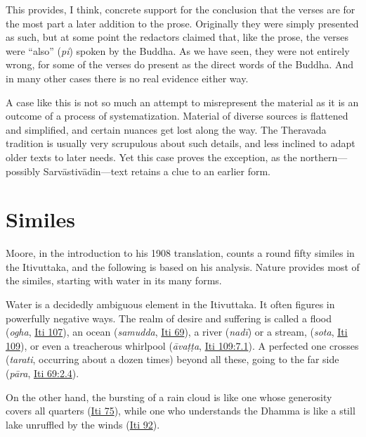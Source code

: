 \documentclass[12pt,openany]{book}%
\begin{document}
This provides, I think, concrete support for the conclusion that the verses are for the most part a later addition to the prose. Originally they were simply presented as such, but at some point the redactors claimed that, like the prose, the verses were “also” (\emph{pi}) spoken by the Buddha. As we have seen, they were not entirely wrong, for some of the verses do present as the direct words of the Buddha. And in many other cases there is no real evidence either way.

A case like this is not so much an attempt to misrepresent the material as it is an outcome of a process of systematization. Material of diverse sources is flattened and simplified, and certain nuances get lost along the way. The Theravada tradition is usually very scrupulous about such details, and less inclined to adapt older texts to later needs. Yet this case proves the exception, as the northern—possibly \textsanskrit{Sarvāstivādin}—text retains a clue to an earlier form.

\section*{Similes}

Moore, in the introduction to his 1908 translation, counts a round fifty similes in the Itivuttaka, and the following is based on his analysis. Nature provides most of the similes, starting with water in its many forms.

Water is a decidedly ambiguous element in the Itivuttaka. It often figures in powerfully negative ways. The realm of desire and suffering is called a flood (\emph{ogha}, \href{https://suttacentral.net/iti107/en/sujato}{Iti 107}), an ocean (\emph{samudda}, \href{https://suttacentral.net/iti69/en/sujato}{Iti 69}), a river (\emph{\textsanskrit{nadī}}) or  a stream, (\emph{sota}, \href{https://suttacentral.net/iti109/en/sujato}{Iti 109}), or even a treacherous whirlpool (\emph{\textsanskrit{āvaṭṭa}}, \href{https://suttacentral.net/iti109/en/sujato\#7.1}{Iti 109:7.1}). A perfected one crosses (\emph{tarati}, occurring about a dozen times) beyond all these, going to the far side (\emph{\textsanskrit{pāra}}, \href{https://suttacentral.net/iti69/en/sujato\#2.4}{Iti 69:2.4}).

On the other hand, the bursting of a rain cloud is like one whose generosity covers all quarters (\href{https://suttacentral.net/iti75/en/sujato}{Iti 75}), while one who understands the Dhamma is like a still lake unruffled by the winds (\href{https://suttacentral.net/iti92/en/sujato}{Iti 92}).
\end{document}

